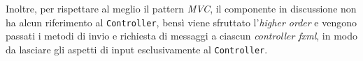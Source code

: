 Inoltre, per rispettare al meglio il pattern \textit{MVC}, il componente in discussione non ha alcun riferimento al
\texttt{Controller}, bensì viene sfruttato l'\textit{higher order} e vengono passati i metodi di invio e richiesta di
messaggi a ciascun \textit{controller fxml}, in modo da lasciare gli aspetti di input esclusivamente al
\texttt{Controller}.